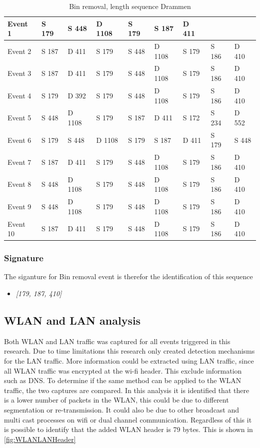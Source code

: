 \begin{table}[H]
\centering
\caption{Bin removal, length sequence Drammen}
\label{tab:BRSquenceDrammen}
\begin{tabular}{|l|l|l|l|l|l|l|l|l|}
\hline
Event 1  & S 179   & S 448  & D 1108 & S 179 & S 187  & D 411 &       &       \\ \hline
Event 2  & S   187 & D 411  & S 179  & S 448 & D 1108 & S 179 & S 186 & D 410 \\ \hline
Event 3  & S   187 & D 411  & S 179  & S 448 & D 1108 & S 179 & S 186 & D 410 \\ \hline
Event 4  & S   179 & D 392  & S 179  & S 448 & D 1108 & S 179 & S 186 & D 410 \\ \hline
Event 5  & S   448 & D 1108 & S 179  & S 187 & D 411  & S 172 & S 234 & D 552 \\ \hline
Event 6  & S 179   & S 448  & D 1108 & S 179 & S 187  & D 411 & S 179 & S 448 \\ \hline
Event 7  & S   187 & D 411  & S 179  & S 448 & D 1108 & S 179 & S 186 & D 410 \\ \hline
Event 8  & S   448 & D 1108 & S 179  & S 448 & D 1108 & S 179 & S 186 & D 410 \\ \hline
Event 9  & S   448 & D 1108 & S 179  & S 448 & D 1108 & S 179 & S 186 & D 410 \\ \hline
Event 10 & S   187 & D 411  & S 179  & S 448 & D 1108 & S 179 & S 186 & D 410 \\ \hline
\end{tabular}
\end{table}

\subsubsection{Signature}
The siganture for Bin removal event is therefor the identification of this sequence
\begin{itemize}
    \item \textit{[179, 187, 410]}
\end{itemize}


\subsection{WLAN and LAN analysis}
Both WLAN and LAN traffic was captured for all events triggered in this research. Due to time limitations this research only created detection mechanisms for the LAN traffic. More information could be extracted using LAN traffic, since all WLAN traffic was encrypted at the wi-fi header. This exclude information such as DNS. 
To determine if the same method can be applied to the WLAN traffic, the two captures are compared. In this analysis it is identified that there is a lower number of packets in the WLAN, this could be due to different segmentation or re-transmission. It could also be due to other broadcast and multi cast processes on wifi or dual channel communication.   Regardless of this it is possible to identify that the added WLAN header is 79 bytes. This is shown in \ref{fig:WLANLANHeader}

